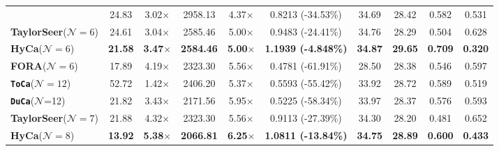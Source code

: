 \begin{table}[htbp]
{\begin{tabular}{l | c  c | c  c | c  c | c c c}
& 24.83 & 3.02$\times$ & 2958.13 & 4.37$\times$ & 0.8213 \textcolor{gray!70}{\scriptsize (-34.53\%)} & {34.69} &{28.42} & {0.582} & {0.531} \\
\textbf{TaylorSeer}($\mathcal{N}=6$)
& 24.61 & 3.04$\times$ & 2585.46 & 5.00$\times$ & 0.9483 \textcolor{gray!70}{\scriptsize (-24.41\%)} & 34.76 & 28.29 & 0.504 & 0.628 \\
\rowcolor{gray!20}
\textbf{HyCa}($\mathcal{N}=6$)
& \textbf{21.58} & \textbf{3.47}$\times$ & \textbf{2584.46} & \textbf{5.00}$\times$ & \bf {1.1939} \textcolor[HTML]{0f98b0}{\scriptsize (-4.848\%)} & \textbf{34.87} & \textbf{29.65} & \textbf{0.709} & \textbf{0.320} \\
\midrule
\textbf{FORA}($\mathcal{N}=6$)
& 17.89 & 4.19$\times$ & 2323.30 & 5.56$\times$ & 0.4781 \textcolor{gray!70}{\scriptsize (-61.91\%)} & 28.50 & 28.38 & 0.546 & 0.597 \\
\textbf{\texttt{ToCa}}($\mathcal{N}=12$)
& 52.72 & 1.42$\times$ & 2406.20 & 5.37$\times$ & 0.5593 \textcolor{gray!70}{\scriptsize (-55.42\%)} & 33.92 & 28.72 & 0.589 & 0.519 \\
\textbf{\texttt{DuCa}}($\mathcal{N}$=12)
& 21.82 & 3.43$\times$ & 2171.56 & 5.95$\times$ & 0.5225 \textcolor{gray!70}{\scriptsize (-58.34\%)} & 33.97 & 28.37 & 0.576 & 0.593 \\
\textbf{TaylorSeer}($\mathcal{N}=7$)
& 21.88 & 4.32$\times$ & 2323.30 & 5.56$\times$ & 0.9113 \textcolor{gray!70}{\scriptsize (-27.39\%)} & 34.30 & 28.20 & 0.481 & 0.652 \\
\rowcolor{gray!20}
\textbf{HyCa}($\mathcal{N}=8$)
& \textbf{13.92} & \textbf{5.38}$\times$ & \textbf{2066.81} & \textbf{6.25}$\times$ & \bf {1.0811} \textcolor[HTML]{0f98b0}{\scriptsize (-13.84\%)} & \textbf{34.75} & \textbf{28.89} & \textbf{0.600} & \textbf{0.433} \\
\bottomrule
\end{tabular}}
\label{table:Qwenimage}
\end{table}

